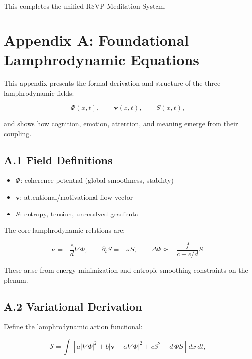 \documentclass[12pt]{article}
\begin{document}
This completes the unified RSVP Meditation System.


\appendix
\section*{Appendix A: Foundational Lamphrodynamic Equations}

This appendix presents the formal derivation and structure of the three
lamphrodynamic fields:

\[
\Phi(x,t), \qquad \mathbf{v}(x,t), \qquad S(x,t),
\]

and shows how cognition, emotion, attention, and meaning emerge from their
coupling.

\subsection*{A.1 Field Definitions}

\begin{itemize}
    \item $\Phi$: coherence potential (global smoothness, stability)
    \item $\mathbf{v}$: attentional/motivational flow vector
    \item $S$: entropy, tension, unresolved gradients
\end{itemize}

The core lamphrodynamic relations are:

\[
\mathbf{v} = - \frac{e}{d} \nabla \Phi,
\qquad
\partial_t S = -\kappa S,
\qquad
\Delta \Phi \approx -\frac{f}{c + e/d} S.
\]

These arise from energy minimization and entropic smoothing constraints on the
plenum.

\subsection*{A.2 Variational Derivation}

Define the lamphrodynamic action functional:

\[
\mathcal{S}
=
\int \left[
a |\nabla \Phi|^2
+ b |\mathbf{v} + \alpha \nabla \Phi|^2
+ c S^2
+ d \,\Phi S
\right] \, dx\,dt,
\]
\end{document}
